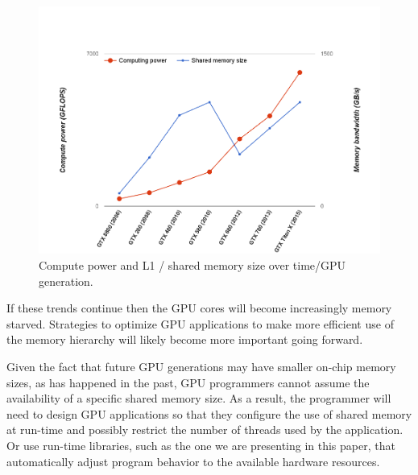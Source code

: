 \begin{figure}[ht]
\center
\includegraphics[scale=0.26]{computevsshared.png}
\caption{\footnotesize\textnormal{Compute power and  L1 / shared memory size over time/GPU generation.}}
\label{fig:memsize}
\vspace{-0.4cm}
\end{figure}

If these trends continue then the GPU cores will become increasingly memory starved.
Strategies to optimize GPU applications to make more efficient use of the memory hierarchy will likely become more important going forward.

Given the fact that future GPU generations may have smaller on-chip memory sizes, as has happened in
the past, GPU programmers cannot assume the availability of a specific shared memory size.
As a result, the programmer will need to design GPU applications so that they configure the use of
shared memory at run-time and possibly restrict the number of threads used by the application.
Or use run-time libraries, such as the one we are presenting in this paper, that automatically
adjust program behavior to the available hardware resources.

